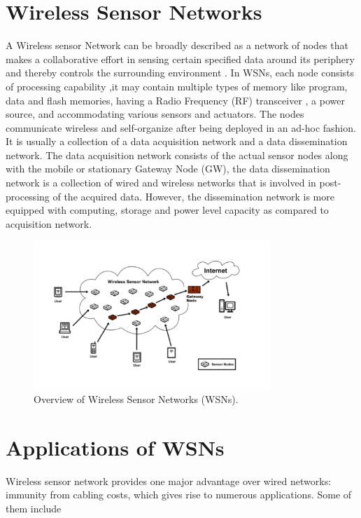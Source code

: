 \documentclass[a4paper,12pt]{report}
\begin{document}
\section{Wireless Sensor Networks}
A Wireless sensor Network can be broadly described as a network of
nodes that makes a collaborative effort in sensing certain specified
data around its periphery and thereby controls the surrounding
environment \cite{verdone}. In WSNs, each node consists of
processing capability ,it may contain multiple types of memory  like
program, data and flash memories, having a Radio Frequency (RF)
transceiver , a power source, and accommodating various sensors and
actuators. The nodes communicate wireless and self-organize after
being deployed in an ad-hoc fashion. It is usually a collection of a
data acquisition network and a data dissemination network. The data
acquisition network consists of the actual sensor nodes along with
the mobile or stationary Gateway Node (GW), the data dissemination
network is a collection of wired and wireless networks that is
involved in post-processing of the acquired data. However, the
dissemination network is more equipped with computing, storage and
power level capacity as compared to acquisition network.

\begin{figure}
\begin{center}
\includegraphics[width=0.8\textwidth]{WSN}
\end{center}
\caption{Overview of Wireless Sensor Networks (WSNs).}
\end{figure}

\section{Applications of WSNs}
Wireless sensor network provides one major advantage over wired
networks: immunity from cabling costs, which gives rise to numerous
applications. Some of them include
\end{document}
